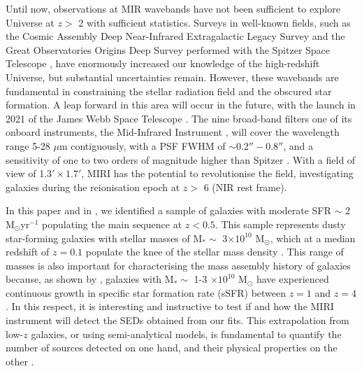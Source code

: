 \documentclass{aa}
\begin{document}
Until now, observations at MIR wavebands have not been sufficient to explore Universe at $z >$ 2 with sufficient statistics. Surveys in well-known fields, such as the Cosmic Assembly Deep Near-Infrared Extragalactic Legacy Survey \citep[CANDELS,][]{ash,gro2,koe} and the Great Observatories Origins Deep Survey \citep[GOODS,][]{gia,wan,hat2,lin} performed with the Spitzer Space Telescope \citep{wer}, have enormously increased our knowledge of the high-redshift Universe, but substantial uncertainties remain. However, these wavebands are fundamental in constraining the stellar radiation field and the obscured star formation. A leap forward in this area will occur in the future, with the launch in 2021 of the James Webb Space Telescope \citep[JWST,][]{gar}. The nine broad-band filters one of its onboard instruments, the Mid-Infrared Instrument \citep[MIRI,][]{rie2,wri2}, will cover the wavelength range 5-28 $\mu$m contiguously, with a PSF FWHM of $\sim0.2''-0.8''$, and a sensitivity of one to two orders of magnitude higher than Spitzer \citep{gla}. With a field of view of 1.3$' \times 1.7'$, MIRI has the potential to revolutionise the field, investigating galaxies during the reionisation epoch at $z >$ 6 (NIR rest frame).

In this paper and in \cite{pap2}, we identified a sample of galaxies with moderate SFR $\sim$ 2 M$_\odot$yr$^{-1}$ populating the main sequence at $z < 0.5$. This sample represents dusty star-forming galaxies with stellar masses of M$_\ast \sim$ 3$\times10^{10}$ M$_\odot$, which at a median redshift of $z = 0.1$ populate the knee of the stellar mass density \citep{fur}. This range of masses is also important for characterising the mass assembly history of galaxies because, as shown by \cite{ilb2}, galaxies with M$_\ast \sim$ 1-3 $\times 10^{10}$ M$_\odot$ have experienced continuous growth in specific star formation rate (sSFR) between $z = 1$ and $z = 4$. In this respect, it is interesting and instructive to test if and how the MIRI instrument will detect the SEDs obtained from our fits. This extrapolation from low-$z$ galaxies, or using semi-analytical models, is fundamental to quantify  the number of sources detected on
one hand, and their physical properties on the other \citep[see also][]{mas,furl,cow,wil,yun}. 
\end{document}
